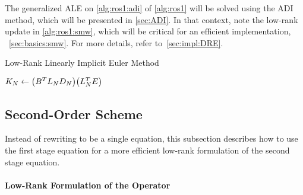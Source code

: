 \begin{remark}
  The generalized \ac{ALE} on
  \autoref{alg:ros1:adi} of \autoref{alg:ros1}
  will be solved using the \ac{ADI} method,
  which will be presented in \autoref{sec:ADI}.
  In that context, note the low-rank update in \autoref{alg:ros1:smw},
  which will be critical for an efficient implementation,
  \cf~\autoref{sec:basics:smw}.
  For more details, refer to~\autoref{sec:impl:DRE}.
\end{remark}

\begin{algorithm}[t]
  \caption{Low-Rank Linearly Implicit Euler Method}
  \label{alg:ros1}
  $K_N \gets \big( B^T L_N D_N \big) \big( L_N^T E \big)$\;
\end{algorithm}

\subsection{Second-Order Scheme}

Instead of rewriting  to be a single equation,
this subsection describes how to use the first stage equation for a more efficient low-rank formulation of the second stage equation.

\paragraph{Low-Rank Formulation of the \Riccati Operator}

